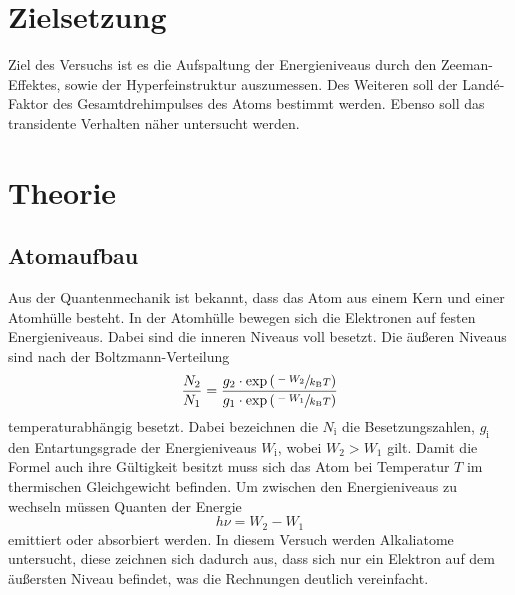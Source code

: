 \section{Zielsetzung}
\label{sec:Zielsetzung}
Ziel des Versuchs ist es die Aufspaltung der Energieniveaus durch den Zeeman-Effektes,
sowie der Hyperfeinstruktur auszumessen. Des Weiteren soll der Landé-Faktor des Gesamtdrehimpulses
des Atoms bestimmt werden. Ebenso soll das transidente Verhalten näher untersucht werden.

\section{Theorie}
\label{sec:Theorie}
\subsection{Atomaufbau}
\label{sec:atomaufbau}
Aus der Quantenmechanik ist bekannt, dass das Atom aus einem Kern und einer Atomhülle besteht.
In der Atomhülle bewegen sich die Elektronen auf festen Energieniveaus. Dabei sind die inneren
Niveaus voll besetzt. Die äußeren Niveaus sind nach der Boltzmann-Verteilung
\begin{equation}
  \label{eqn:boltz}
  \frac{N_2}{N_1} = \frac{g_2 \cdot \exp{\left(\sfrac{-W_2}{k_\text{B}T}\right)}}{g_1 \cdot \exp{\left(\sfrac{-W_1}{k_\text{B}T}\right)}}
\end{equation}
temperaturabhängig besetzt. Dabei bezeichnen die $N_\text{i}$ die Besetzungszahlen, $g_\text{i}$ den Entartungsgrade
der Energieniveaus $W_\text{i}$, wobei $W_2 > W_1$ gilt. Damit die Formel auch ihre Gültigkeit besitzt
muss sich das Atom bei Temperatur $T$ im thermischen Gleichgewicht befinden.
Um zwischen den Energieniveaus zu wechseln müssen Quanten der Energie
\begin{equation}
  \label{eqn:energiedifferenz}
  h \nu = W_2 - W_1
\end{equation}
emittiert oder absorbiert werden. 
In diesem Versuch werden Alkaliatome untersucht, diese zeichnen sich dadurch aus, dass sich nur ein 
Elektron auf dem äußersten Niveau befindet, was die Rechnungen deutlich vereinfacht.

